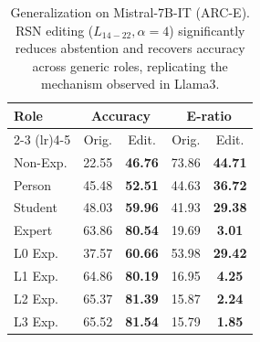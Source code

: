 \documentclass{article}
\begin{document}
\begin{table}[htbp]
\centering
\caption{Generalization on Mistral-7B-IT (ARC-E). RSN editing ($L_{14-22}, \alpha{=}4$) significantly reduces abstention and recovers accuracy across generic roles, replicating the mechanism observed in Llama3.}
\label{tab:app-mistral-arc}
\setlength{\tabcolsep}{8pt}
\renewcommand{\arraystretch}{1.0}
\small
\begin{tabular}{l c c c c}
\toprule
\textbf{Role}
& \multicolumn{2}{c}{\textbf{Accuracy}} 
& \multicolumn{2}{c}{\textbf{E-ratio}} \\
\cmidrule(lr){2-3} \cmidrule(lr){4-5}
& Orig. & Edit. & Orig. & Edit. \\
\midrule
Non-Exp.   & 22.55 & \textbf{46.76} & 73.86 & \textbf{44.71} \\
Person     & 45.48 & \textbf{52.51} & 44.63 & \textbf{36.72} \\
Student    & 48.03 & \textbf{59.96} & 41.93 & \textbf{29.38} \\
Expert     & 63.86 & \textbf{80.54} & 19.69 & \textbf{3.01} \\
L0 Exp.    & 37.57 & \textbf{60.66} & 53.98 & \textbf{29.42} \\
L1 Exp.    & 64.86 & \textbf{80.19} & 16.95 & \textbf{4.25} \\
L2 Exp.    & 65.37 & \textbf{81.39} & 15.87 & \textbf{2.24} \\
L3 Exp.    & 65.52 & \textbf{81.54} & 15.79 & \textbf{1.85} \\
\bottomrule
\end{tabular}
\end{table}
\end{document}
